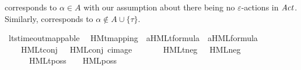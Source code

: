 \begin{isabellebody}
\begin{isamarkuptext}
 corresponds to $\alpha \in A$ with our assumption about there being no $\varepsilon$-actions in $\mathit{Act}$. Similarly,  corresponds to $\alpha \notin A \cup \{\tau\}$.%
\end{isamarkuptext}\isamarkuptrue%
\isamarkupfalse%
\ lts{\isacharunderscore}{\kern0pt}timeout{\isacharunderscore}{\kern0pt}mappable\ \isanewline
\isanewline
{}\isamarkupfalse%
\ HMt{\isacharunderscore}{\kern0pt}mapping\ {\isacharcolon}{\kern0pt}{\isacharcolon}{\kern0pt}\ {\isacartoucheopen}{\isacharparenleft}{\kern0pt}{\isacharprime}{\kern0pt}a{\isacharparenright}{\kern0pt}HMLt{\isacharunderscore}{\kern0pt}formula\ {\isasymRightarrow}\ {\isacharparenleft}{\kern0pt}{\isacharprime}{\kern0pt}a{\isacharparenright}{\kern0pt}HML{\isacharunderscore}{\kern0pt}formula{\isacartoucheclose}\ \isanewline
\ \ {\isacharparenleft}{\kern0pt}{\isacartoucheopen}{\isasymsigma}{\isacharprime}{\kern0pt}{\isacharparenleft}{\kern0pt}{\isacharunderscore}{\kern0pt}{\isacharprime}{\kern0pt}{\isacharparenright}{\kern0pt}{\isacartoucheclose}{\isacharparenright}{\kern0pt}\isanewline
\ \ \isanewline
\ \ \ \ {\isacartoucheopen}{\isasymsigma}{\isacharparenleft}{\kern0pt}HMLt{\isacharunderscore}{\kern0pt}conj\ {\isasymPhi}{\isacharparenright}{\kern0pt}\ {\isacharequal}{\kern0pt}\ HML{\isacharunderscore}{\kern0pt}conj\ {\isacharparenleft}{\kern0pt}cimage\ {\isacharparenleft}{\kern0pt}{\isasymlambda}\ {\isasymphi}{\isachardot}{\kern0pt}\ {\isasymsigma}{\isacharparenleft}{\kern0pt}{\isasymphi}{\isacharparenright}{\kern0pt}{\isacharparenright}{\kern0pt}\ {\isasymPhi}{\isacharparenright}{\kern0pt}{\isacartoucheclose}\isanewline
\ \ {\isacharbar}{\kern0pt}\ {\isacartoucheopen}{\isasymsigma}{\isacharparenleft}{\kern0pt}HMLt{\isacharunderscore}{\kern0pt}neg\ {\isasymphi}{\isacharparenright}{\kern0pt}\ {\isacharequal}{\kern0pt}\ HML{\isacharunderscore}{\kern0pt}neg\ {\isasymsigma}{\isacharparenleft}{\kern0pt}{\isasymphi}{\isacharparenright}{\kern0pt}{\isacartoucheclose}\isanewline
\ \ {\isacharbar}{\kern0pt}\ {\isacartoucheopen}{\isasymalpha}\ {\isacharequal}{\kern0pt}\ {\isasymtau}\ {\isasymLongrightarrow}\isanewline
\ \ \ \ \ \ {\isasymsigma}{\isacharparenleft}{\kern0pt}HMLt{\isacharunderscore}{\kern0pt}poss\ {\isasymalpha}\ {\isasymphi}{\isacharparenright}{\kern0pt}\ {\isacharequal}{\kern0pt}\ HML{\isacharunderscore}{\kern0pt}poss\ {\isasymalpha}\ {\isasymsigma}{\isacharparenleft}{\kern0pt}{\isasymphi}{\isacharparenright}{\kern0pt}{\isacartoucheclose}\isanewline

\end{isabellebody}
